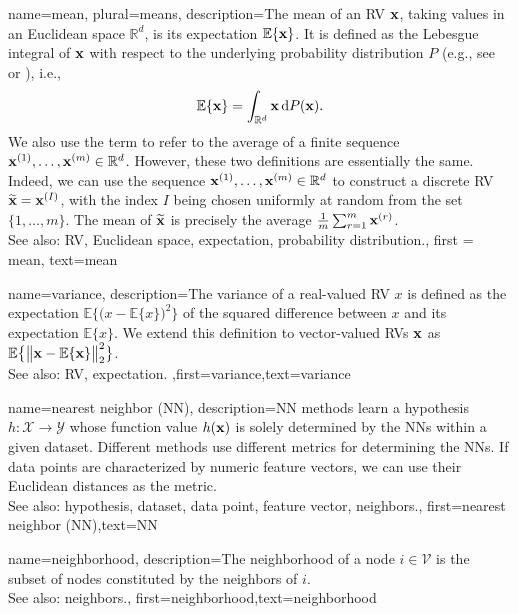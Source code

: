 {
	name={mean}, plural={means},
	description={The  mean of an RV ${\bf x}$, taking 
 values in an Euclidean space $\mathbb{R}^{d}$, is its 
 expectation $\mathbb{E} \{{\bf x}\}$. It is defined as the Lebesgue 
 integral of ${\bf x}$ with respect to the underlying probability distribution $P$ (e.g., see \cite{RudinBookPrinciplesMatheAnalysis} or \cite{BillingsleyProbMeasure}), i.e.,
\[
\mathbb{E} \{{\bf x}\} = \int_{\mathbb{R}^{d}} {\bf x} \, \mathrm{d}P({\bf x}).
\] 
We also use the term to refer to the average of a finite sequence 
${\bf x}^{(1)}, \ldots, {\bf x}^{(m)} \in \mathbb{R}^{d}$. However, 
these two definitions are essentially the same. Indeed, we can use the sequence 
${\bf x}^{(1)}, \ldots, {\bf x}^{(m)} \in \mathbb{R}^{d}$ to construct a 
discrete RV $\widetilde{{\bf x}}={\bf x}^{(I)}$, with the index $I$ being chosen uniformly 
at random from the set $\{1,\ldots,m\}$. The mean of $\widetilde{{\bf x}}$ is 
precisely the average $\frac{1}{m} \sum_{r=1}^{m} {\bf x}^{(r)}$.
			\\ 
		See also: RV, Euclidean space, expectation, probability distribution.}, 
		first = {mean}, text={mean} 
}

{
	name={variance},
	description={The variance of a real-valued RV $x$ is defined as the expectation 
		$\mathbb{E} \big\{ \big( x - \mathbb{E} \{x \} \big)^{2} \big\}$ of the squared difference between $x$ 
		and its expectation $\mathbb{E} \{x \}$. We extend this definition to vector-valued RVs ${\bf x}$ 
		as $\mathbb{E} \big\{ \big\| {\bf x} - \mathbb{E} \{{\bf x} \} \big\|_{2}^{2} \big\}$.
					\\ 
		See also: RV, expectation.} ,first={variance},text={variance} 
}

{
	name={nearest neighbor (NN)},
	description={NN methods learn a hypothesis 
		$h: \mathcal{X} \rightarrow \mathcal{Y}$ whose function value $h({\bf x})$ 
		is solely determined by the NNs within a given dataset. Different 
		methods use different metrics for determining the NNs. If data points 
		are characterized by numeric feature vectors, we can use their Euclidean distances as 
		the metric.
					\\ 
		See also: hypothesis, dataset, data point, feature vector, neighbors.},
	first={nearest neighbor (NN)},text={NN} 
}

{
	name={neighborhood},
	description={The neighborhood of a node $i \in \mathcal{V}$ is 
	the subset of nodes constituted by the neighbors of $i$.
				\\ 
		See also: neighbors.},
	first={neighborhood},text={neighborhood} 
}


